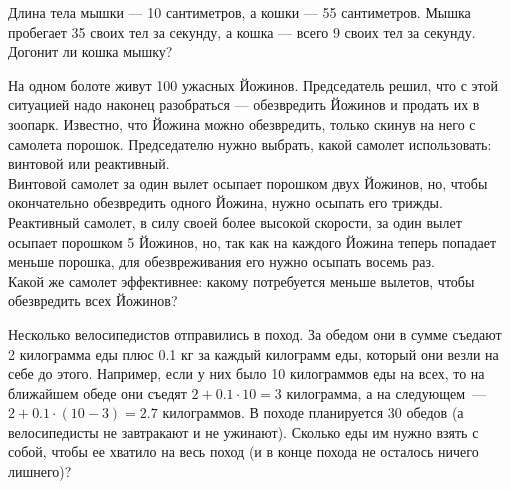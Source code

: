 ﻿
\begin{enumerate}
\itA Длина тела мышки — 10 сантиметров, а кошки — 55 сантиметров. Мышка пробегает 35 своих тел за секунду, а кошка — всего 9 своих тел за секунду. Догонит ли кошка мышку?

\itB На одном болоте живут 100 ужасных Йожинов. Председатель решил, что с этой ситуацией надо наконец разобраться — обезвредить Йожинов и продать их в зоопарк. Известно, что Йожина можно обезвредить, только скинув на него с самолета порошок. Председателю нужно выбрать, какой самолет использовать: винтовой или реактивный. \smallskip \\
Винтовой самолет за один вылет осыпает порошком двух Йожинов, но, чтобы окончательно обезвредить одного Йожина, нужно осыпать его трижды. Реактивный самолет, в силу своей более высокой скорости, за один вылет осыпает порошком 5 Йожинов, но, так как на каждого Йожина теперь попадает меньше порошка, для обезвреживания его нужно осыпать восемь раз. \smallskip \\
Какой же самолет эффективнее: какому потребуется меньше вылетов, чтобы обезвредить всех Йожинов?

\itC Несколько велосипедистов отправились в поход. За обедом они в сумме съедают 2 килограмма еды плюс 0.1 кг за каждый килограмм еды, который они везли на себе до этого. Например, если у них было 10 килограммов еды на всех, то на ближайшем обеде они съедят $2 + 0.1 \cdot 10 = 3$ килограмма, а на следующем~— $2 + 0.1 \cdot (10-3) = 2.7$ килограммов. В походе планируется 30 обедов (а велосипедисты не завтракают и не ужинают). Сколько еды им нужно взять с собой, чтобы ее хватило на весь поход (и в конце похода не осталось ничего лишнего)?
\end{enumerate}